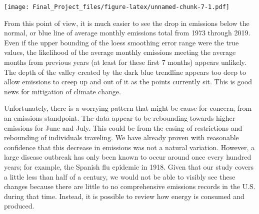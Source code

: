 \documentclass[
]{article}
\begin{document}
\texttt{[image: Final\_Project\_files/figure-latex/unnamed-chunk-7-1.pdf]}

From this point of view, it is much easier to see the drop in emissions
below the normal, or blue line of average monthly emissions total from
1973 through 2019. Even if the upper bounding of the loess smoothing
error range were the true values, the likelihood of the average monthly
emissions meeting the average months from previous years (at least for
these first 7 months) appears unlikely. The depth of the valley created
by the dark blue trendline appears too deep to allow emissions to creep
up and out of it as the points currently sit. This is good news for
mitigation of climate change.

Unfortunately, there is a worrying pattern that might be cause for
concern, from an emissions standpoint. The data appear to be rebounding
towards higher emissions for June and July. This could be from the
easing of restrictions and rebounding of individuals traveling. We have
already proven with reasonable confidence that this decrease in
emissions was not a natural variation. However, a large disease outbreak
has only been known to occur around once every hundred years; for
example, the Spanish flu epidemic in 1918. Given that our study covers a
little less than half of a century, we would not be able to visibly see
these changes because there are little to no comprehensive emissions
records in the U.S. during that time. Instead, it is possible to review
how energy is consumed and produced.
\end{document}
